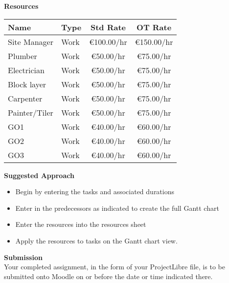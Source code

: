 \newpage
\large\textbf{Resources}\\
\vspace{.25cm}


\begin{tabular}{|l|l|c|c|}
	\hline 
	\textbf{Name} & \textbf{Type} & \textbf{Std Rate} & \textbf{OT Rat}e \\ 
	\hline 
	Site Manager	& Work	& \euro100.00/hr & 	\euro150.00/hr\\
	Plumber			& Work	& \euro50.00/hr	& \euro75.00/hr\\
	Electrician		& Work	& \euro50.00/hr	& \euro75.00/hr\\
	Block layer		& Work	& \euro50.00/hr	& \euro75.00/hr\\
	Carpenter		& Work	& \euro50.00/hr	& \euro75.00/hr\\
	Painter/Tiler	& Work	& \euro50.00/hr	& \euro75.00/hr\\
	GO1				& Work	& \euro40.00/hr	& \euro60.00/hr\\
	GO2				& Work	& \euro40.00/hr	& \euro60.00/hr\\
	GO3				& Work	& \euro40.00/hr	& \euro60.00/hr\\
	\hline
\end{tabular} 



\vspace{.5cm}

\large\textbf{Suggested Approach}\\

\begin{itemize}
	\item Begin by entering the tasks and associated durations
	\item Enter in the predecessors as indicated to create the full Gantt chart
	\item Enter the resources into the resources sheet
	\item Apply the resources to tasks on the Gantt chart view.
\end{itemize}

\vspace{1cm}


\large\textbf{Submission}\\
Your completed assignment, in the form of your ProjectLibre file, is to be submitted onto Moodle on or before the date or time indicated there.



